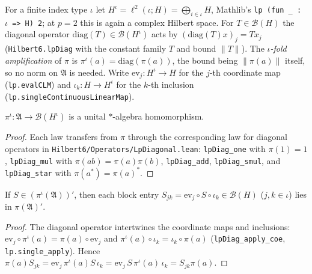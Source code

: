 \begin{definition}
    \label{def:finite-amplification}
    \leanok
    For a finite index type $\iota$ let $H^\iota = \ell^2(\iota; H) = \bigoplus_{i \in \iota} H$, Mathlib's \texttt{lp (fun \_ : $\iota$ => H) 2}; at $p = 2$ this is again a complex Hilbert space. For $T \in \mathcal{B}(H)$ the diagonal operator $\mathrm{diag}(T) \in \mathcal{B}(H^\iota)$ acts by $(\mathrm{diag}(T)x)_j = T x_j$ (\texttt{Hilbert6.lpDiag} with the constant family $T$ and bound $\lVert T \rVert$). The \emph{$\iota$-fold amplification} of $\pi$ is $\pi^\iota(a) = \mathrm{diag}(\pi(a))$, the bound being $\lVert \pi(a) \rVert$ itself, so no norm on $\mathfrak{A}$ is needed. Write $\mathrm{ev}_j : H^\iota \to H$ for the $j$-th coordinate map (\texttt{lp.evalCLM}) and $\iota_k : H \to H^\iota$ for the $k$-th inclusion (\texttt{lp.singleContinuousLinearMap}).
\end{definition}

\begin{lemma}
    \label{lmm:finite-amplification-star-hom}
    \leanok
    $\pi^\iota : \mathfrak{A} \to \mathcal{B}(H^\iota)$ is a unital $*$-algebra homomorphism.
\end{lemma}
\begin{proof}
    \leanok
    Each law transfers from $\pi$ through the corresponding law for diagonal operators in \texttt{Hilbert6/Operators/LpDiagonal.lean}: \texttt{lpDiag\_one} with $\pi(1) = 1$, \texttt{lpDiag\_mul} with $\pi(ab) = \pi(a)\pi(b)$, \texttt{lpDiag\_add}, \texttt{lpDiag\_smul}, and \texttt{lpDiag\_star} with $\pi(a^*) = \pi(a)^*$.
\end{proof}

\begin{lemma}
    \label{lmm:commutant-of-amplification-entries}
    \leanok
    If $S \in (\pi^\iota(\mathfrak{A}))'$, then each block entry $S_{jk} = \mathrm{ev}_j \circ S \circ \iota_k \in \mathcal{B}(H)$ ($j, k \in \iota$) lies in $\pi(\mathfrak{A})'$.
\end{lemma}
\begin{proof}
    \leanok
    The diagonal operator intertwines the coordinate maps and inclusions: $\mathrm{ev}_j \circ \pi^\iota(a) = \pi(a) \circ \mathrm{ev}_j$ and $\pi^\iota(a) \circ \iota_k = \iota_k \circ \pi(a)$ (\texttt{lpDiag\_apply\_coe}, \texttt{lp.single\_apply}). Hence $\pi(a) S_{jk} = \mathrm{ev}_j\, \pi^\iota(a) S\, \iota_k = \mathrm{ev}_j\, S\, \pi^\iota(a)\, \iota_k = S_{jk}\pi(a)$.
\end{proof}

